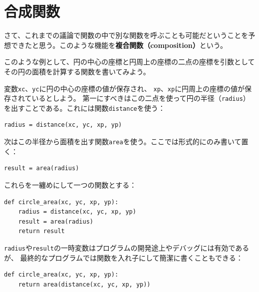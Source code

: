 \documentclass[a4j,12pt,makeidx]{jbook}
\begin{document}
\section{合成関数}
さて、これまでの議論で関数の中で別な関数を呼ぶことも可能だということを予想できたと思う。このような機能を{\bf 複合関数（composition）}という。\par
このような例として、円の中心の座標と円周上の座標の二点の座標を引数としてその円の面積を計算する関数を書いてみよう。\par
変数{\tt xc}、{\tt yc}に円の中心の座標の値が保存され、
{\tt xp}、{\tt xp}に円周上の座標の値が保存されているとしよう。
第一にすべきはこの二点を使って円の半径（{\tt radius}）を出すことである。これには関数{\tt distance}を使う：
\begin{verbatim}
radius = distance(xc, yc, xp, yp)
\end{verbatim}
次はこの半径から面積を出す関数{\tt area}を使う。ここでは形式的にのみ書いて置く：
\begin{verbatim}
result = area(radius)
\end{verbatim}
これらを一纏めにして一つの関数とする：
\begin{verbatim}
def circle_area(xc, yc, xp, yp):
    radius = distance(xc, yc, xp, yp)
    result = area(radius)
    return result
\end{verbatim}
{\tt radius}や{\tt result}の一時変数はプログラムの開発途上やデバッグには有効であるが、
最終的なプログラムでは関数を入れ子にして簡潔に書くこともできる：
\begin{verbatim}
def circle_area(xc, yc, xp, yp):
    return area(distance(xc, yc, xp, yp))
\end{verbatim}
%
\end{document}
